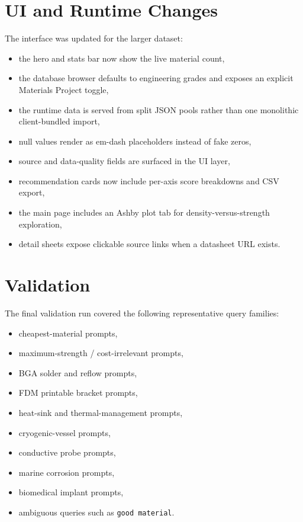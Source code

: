 \documentclass[11pt,a4paper]{article}
\begin{document}
\section{UI and Runtime Changes}

The interface was updated for the larger dataset:

\begin{itemize}[leftmargin=*]
  \item the hero and stats bar now show the live material count,
  \item the database browser defaults to engineering grades and exposes an explicit Materials Project toggle,
  \item the runtime data is served from split JSON pools rather than one monolithic client-bundled import,
  \item null values render as em-dash placeholders instead of fake zeros,
  \item source and data-quality fields are surfaced in the UI layer,
  \item recommendation cards now include per-axis score breakdowns and CSV export,
  \item the main page includes an Ashby plot tab for density-versus-strength exploration,
  \item detail sheets expose clickable source links when a datasheet URL exists.
\end{itemize}

\section{Validation}

The final validation run covered the following representative query families:

\begin{itemize}[leftmargin=*]
  \item cheapest-material prompts,
  \item maximum-strength / cost-irrelevant prompts,
  \item BGA solder and reflow prompts,
  \item FDM printable bracket prompts,
  \item heat-sink and thermal-management prompts,
  \item cryogenic-vessel prompts,
  \item conductive probe prompts,
  \item marine corrosion prompts,
  \item biomedical implant prompts,
  \item ambiguous queries such as \texttt{good material}.
\end{itemize}
\end{document}
